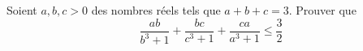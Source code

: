 Soient $a, b, c > 0$ des nombres réels tels que $a + b + c = 3$. Prouver que
$$\frac{ab}{b^3+1}+\frac{bc}{c^3+1}+\frac{ca}{a^3+1}\le\frac32$$
